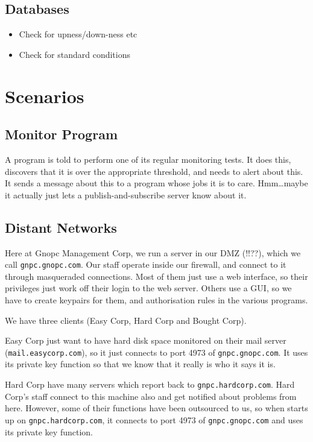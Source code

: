 \documentclass[a4paper]{article}
\begin{document}
\begin{itemize}
\subsection{Databases}

\begin{itemize}
\item Check for upness/down-ness etc
\item Check for standard conditions
\end{itemize}


\section{Scenarios}


\subsection{Monitor Program}

A program is told to perform one of its regular monitoring tests. It
does this, discovers that it is over the appropriate threshold,  and
needs to alert about this.  It sends a message about this to a program
whose jobs it is to care.  Hmm\ldots maybe it actually just lets a 
publish-and-subscribe server know about it.




\subsection{Distant Networks}

Here at Gnopc Management Corp,  we run a \gnopc server in our DMZ (!!??),
which we call \texttt{gnpc.gnopc.com}.   Our staff operate inside our
firewall,  and connect to it through masqueraded connections.  Most of
them just use a web interface,  so their privileges just work off their
login to the web server.  Others use a GUI, so we have to create 
keypairs for them,  and authorisation rules in the various programs.


We have three clients (Easy Corp,  Hard Corp and Bought Corp).  

Easy Corp just want to have hard disk space monitored
on their mail server (\texttt{mail.easycorp.com}),  so it just connects
to port 4973 of \texttt{gnpc.gnopc.com}.  It uses its private key function
so that we know that it really is who it says it is.


Hard Corp have many servers which report back to \texttt{gnpc.hardcorp.com}.
Hard Corp's staff connect to this machine also and get notified about
problems from here.  However,  some of their functions have been outsourced
to us,  so when \gnopc starts up on \texttt{gnpc.hardcorp.com},  it
connects to port 4973 of \texttt{gnpc.gnopc.com} and uses its private
key function.


\end{itemize}
\end{document}
